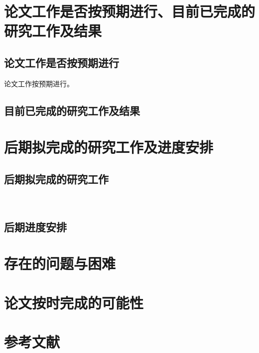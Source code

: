 \section{论文工作是否按预期进行、目前已完成的研究工作及结果}
\subsection{论文工作是否按预期进行}

论文工作按预期进行。

\subsection{目前已完成的研究工作及结果}


\section{后期拟完成的研究工作及进度安排}
\subsection{后期拟完成的研究工作}\

\subsection{后期进度安排}

\section{存在的问题与困难}

\section{论文按时完成的可能性}
\cite{cnproceed}

\section{参考文献}





